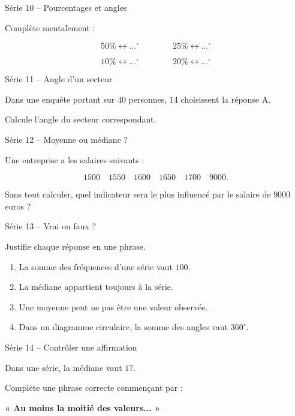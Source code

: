 \documentclass[aspectratio=169,11pt]{beamer}
\newcommand{\serie}[2]{%
\begin{frame}[t]{#1}
\vspace{0.25cm}
#2
\end{frame}
}
\begin{document}
\serie{Série 10 -- Pourcentages et angles}{

Complète mentalement :

\[
50\%\longleftrightarrow\ldots^\circ
\qquad\qquad
25\%\longleftrightarrow\ldots^\circ
\]

\[
10\%\longleftrightarrow\ldots^\circ
\qquad\qquad
20\%\longleftrightarrow\ldots^\circ
\]
}

\serie{Série 11 -- Angle d'un secteur}{

Dans une enquête portant sur \(40\) personnes,
\(14\) choisissent la réponse A.

\medskip

Calcule l'angle du secteur correspondant.
}

\serie{Série 12 -- Moyenne ou médiane ?}{

Une entreprise a les salaires suivants :

\[
1500\quad1550\quad1600\quad1650\quad1700\quad9000.
\]

\medskip

Sans tout calculer, quel indicateur sera le plus influencé
par le salaire de \(9000\) euros ?
}

\serie{Série 13 -- Vrai ou faux ?}{

Justifie chaque réponse en une phrase.

\begin{enumerate}
  \item La somme des fréquences d'une série vaut \(100\).
  \item La médiane appartient toujours à la série.
  \item Une moyenne peut ne pas être une valeur observée.
  \item Dans un diagramme circulaire, la somme des angles vaut \(360^\circ\).
\end{enumerate}
}

\serie{Série 14 -- Contrôler une affirmation}{

Dans une série, la médiane vaut \(17\).

\medskip

Complète une phrase correcte commençant par :

\begin{center}
\Large\bfseries
« Au moins la moitié des valeurs... »
\end{center}
}
\end{document}
